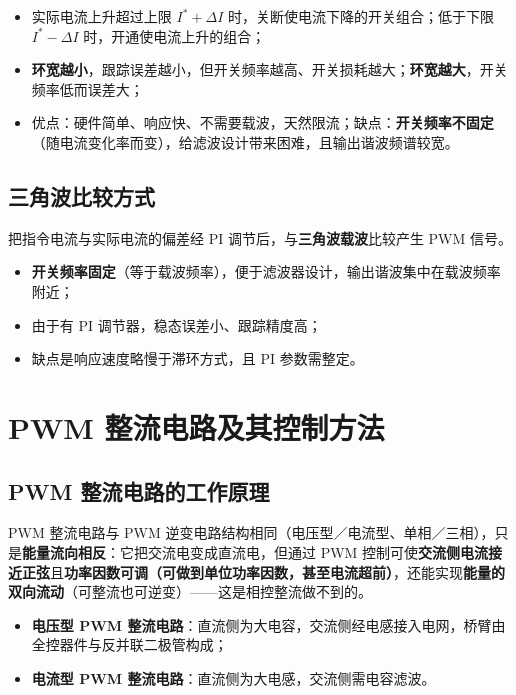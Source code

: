 \begin{itemize}
  \item 实际电流上升超过上限 $I^*+\Delta I$ 时，关断使电流下降的开关组合；低于下限 $I^*-\Delta I$ 时，开通使电流上升的组合；
  \item \textbf{环宽越小}，跟踪误差越小，但开关频率越高、开关损耗越大；\textbf{环宽越大}，开关频率低而误差大；
  \item 优点：硬件简单、响应快、不需要载波，天然限流；缺点：\textbf{开关频率不固定}（随电流变化率而变），给滤波设计带来困难，且输出谐波频谱较宽。
\end{itemize}

\subsection{三角波比较方式}

把指令电流与实际电流的偏差经 PI 调节后，与\textbf{三角波载波}比较产生 PWM 信号。

\begin{itemize}
  \item \textbf{开关频率固定}（等于载波频率），便于滤波器设计，输出谐波集中在载波频率附近；
  \item 由于有 PI 调节器，稳态误差小、跟踪精度高；
  \item 缺点是响应速度略慢于滞环方式，且 PI 参数需整定。
\end{itemize}

\section{PWM 整流电路及其控制方法}

\subsection{PWM 整流电路的工作原理}

PWM 整流电路与 PWM 逆变电路结构相同（电压型／电流型、单相／三相），只是\textbf{能量流向相反}：它把交流电变成直流电，但通过 PWM 控制可使\textbf{交流侧电流接近正弦}且\textbf{功率因数可调（可做到单位功率因数，甚至电流超前）}，还能实现\textbf{能量的双向流动}（可整流也可逆变）——这是相控整流做不到的。

\begin{itemize}
  \item \textbf{电压型 PWM 整流电路}：直流侧为大电容，交流侧经电感接入电网，桥臂由全控器件与反并联二极管构成；
  \item \textbf{电流型 PWM 整流电路}：直流侧为大电感，交流侧需电容滤波。
\end{itemize}

